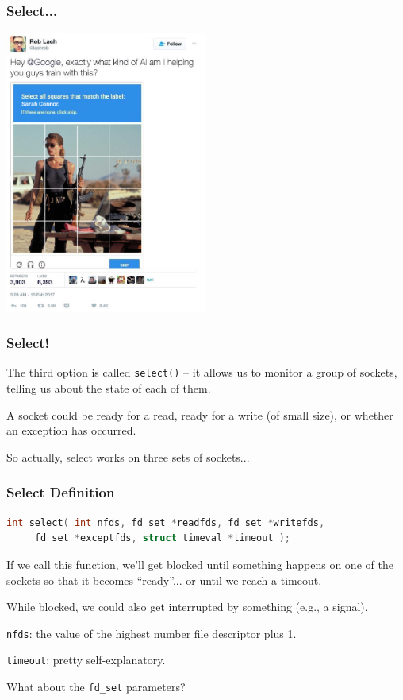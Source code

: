 \begin{frame}
\frametitle{Select...}

\begin{center}
	\includegraphics[width=0.5\textwidth]{images/sarahconnor.png}
\end{center}

\end{frame}

\begin{frame}
\frametitle{Select!}

The third option is called \texttt{select()} -- it allows us to monitor a group of sockets, telling us about the state of each of them. 

A socket could be ready for a read, ready for a write (of small size), or whether an exception has occurred. 

So actually, select works on three sets of sockets...

\end{frame}

\begin{frame}[fragile]
\frametitle{Select Definition}

\begin{lstlisting}[language=C]
 int select( int nfds, fd_set *readfds, fd_set *writefds, 
     fd_set *exceptfds, struct timeval *timeout );
\end{lstlisting}

If we call this function, we'll get blocked until something happens on one of the sockets so that it becomes ``ready''... or until we reach a timeout. 

While blocked, we could also get interrupted by something (e.g., a signal).

\texttt{nfds}: the value of the highest number file descriptor plus 1.

\texttt{timeout}: pretty self-explanatory.

What about the \texttt{fd\_set} parameters?

\end{frame}

